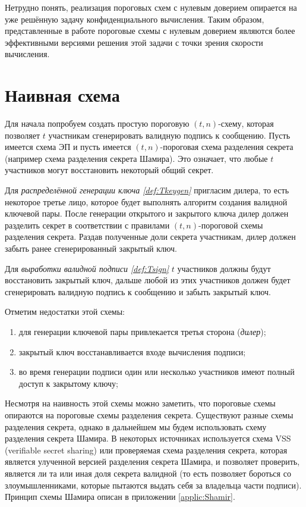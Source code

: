 \documentclass[a4paper,12pt]{article}
\theoremstyle{definition}
\begin{document}
	Нетрудно понять, реализация пороговых схем с нулевым доверием опирается на уже решённую задачу конфиденциального вычисления. Таким образом, представленные в работе пороговые схемы с нулевым доверием являются более эффективными версиями решения этой задачи с точки зрения скорости вычисления.
	
	
	\section{Наивная схема}
	
	Для начала попробуем создать простую пороговую $(t,n)$-схему, которая позволяет $t$ участникам сгенерировать валидную подпись к сообщению. Пусть имеется схема ЭП и пусть имеется $(t, n)$-пороговая схема разделения секрета (например схема разделения секрета Шамира). Это означает, что любые $t$ участников могут восстановить некоторый общий секрет.
	
	Для \emph{распределённой генерации ключа \ref{def:Tkeygen}} пригласим дилера, то есть некоторое третье лицо, которое будет выполнять алгоритм создания валидной ключевой пары. После генерации открытого и закрытого ключа дилер должен разделить секрет в соответствии с правилами $(t, n)$-пороговой схемы разделения секрета. Раздав полученные доли секрета участникам, дилер должен забыть ранее сгенерированный закрытый ключ.
	
	Для \emph{выработки валидной подписи \ref{def:Tsign}} $t$ участников должны будут восстановить закрытый ключ, дальше любой из этих участников должен будет сгенерировать валидную подпись к сообщению и забыть закрытый ключ.
	
	Отметим недостатки этой схемы: 
	\begin{enumerate}[label=\arabic*)]
		\item для генерации ключевой пары привлекается третья сторона (\emph{дилер});
		\item закрытый ключ восстанавливается входе вычисления подписи;
		\item во время генерации подписи один или несколько участников имеют полный доступ к закрытому ключу;
	\end{enumerate}

	Несмотря на наивность этой схемы можно заметить, что пороговые схемы опираются на пороговые схемы разделения секрета. Существуют разные схемы разделения секрета, однако в дальнейшем мы будем использовать схему разделения секрета Шамира. В некоторых источниках используется схема VSS (verifiable secret sharing) или проверяемая схема разделения секрета, которая является улученной версией разделения секрета Шамира, и позволяет проверить, является ли та или иная доля секрета валидной (то есть позволяет бороться со злоумышленниками, которые пытаются выдать себя за владельца части подписи). Принцип схемы Шамира описан в приложении \ref{applic:Shamir}.
	
\end{document}
